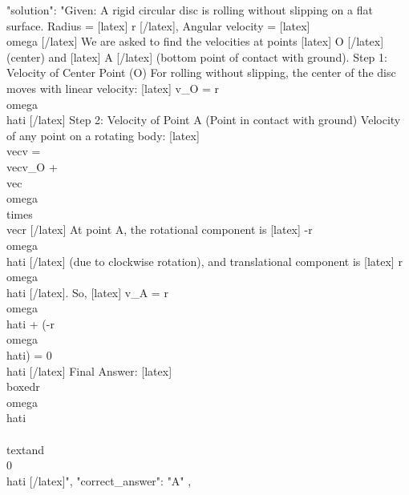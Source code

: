 {    "solution": "Given: A rigid circular disc is rolling without slipping on a flat surface. Radius = [latex] r [/latex], Angular velocity = [latex] \\omega [/latex] We are asked to find the velocities at points [latex] O [/latex] (center) and [latex] A [/latex] (bottom point of contact with ground). Step 1: Velocity of Center Point (O) For rolling without slipping, the center of the disc moves with linear velocity: [latex] v_O = r \\omega \\hat{i} [/latex] Step 2: Velocity of Point A (Point in contact with ground) Velocity of any point on a rotating body: [latex] \\vec{v} = \\vec{v}_O + \\vec{\\omega} \\times \\vec{r} [/latex] At point A, the rotational component is [latex] -r \\omega \\hat{i} [/latex] (due to clockwise rotation), and translational component is [latex] r \\omega \\hat{i} [/latex]. So, [latex] v_A = r\\omega \\hat{i} + (-r\\omega \\hat{i}) = 0 \\hat{i} [/latex] Final Answer: [latex] \\boxed{r\\omega \\hat{i} \\ \\text{and} \\ 0 \\hat{i}} [/latex]",
    "correct_answer": "A"
  },
